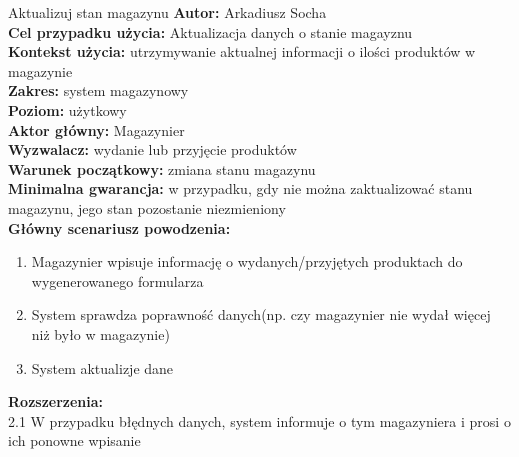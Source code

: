 	\begin{usecase}{Aktualizuj stan magazynu}
		\textbf{Autor:} Arkadiusz Socha\\
		\textbf{Cel przypadku użycia:} Aktualizacja danych o stanie magayznu \\
		\textbf{Kontekst użycia:} utrzymywanie aktualnej informacji o ilości produktów w magazynie \\
		\textbf{Zakres:} system magazynowy \\
		\textbf{Poziom:} użytkowy \\
		\textbf{Aktor główny:} Magazynier \\
		\textbf{Wyzwalacz:} wydanie lub przyjęcie produktów \\
		\textbf{Warunek początkowy:} zmiana stanu magazynu \\
		\textbf{Minimalna gwarancja:} w przypadku, gdy nie można zaktualizować stanu magazynu, jego stan pozostanie niezmieniony \\
		\textbf{Główny scenariusz powodzenia:} 
			\begin{enumerate}
				\item Magazynier wpisuje informację o wydanych/przyjętych produktach do wygenerowanego formularza
				\item System sprawdza poprawność danych(np. czy magazynier nie wydał więcej niż było w magazynie)
				\item System aktualizje dane
			\end{enumerate}
		\textbf{Rozszerzenia:} \\
		2.1 W przypadku błędnych danych, system informuje o tym magazyniera i prosi o ich ponowne wpisanie\\
	\end{usecase}

